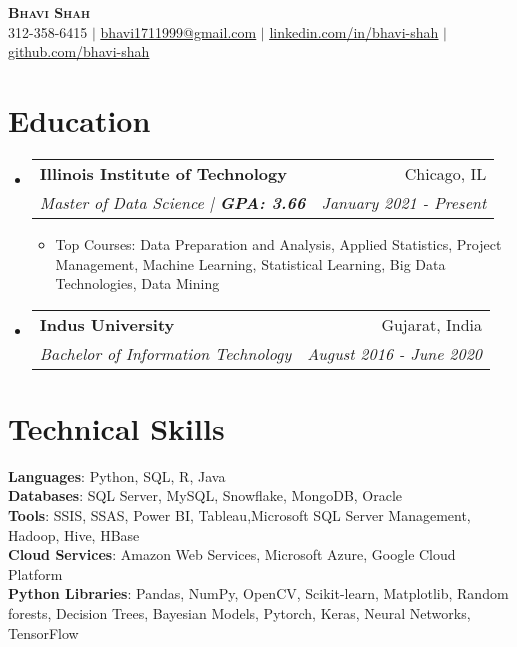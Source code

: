 \documentclass[letterpaper,11pt]{article}
\makeatletter
\newcommand{\resumeItem}[1]{
  \item\small{
    {#1 \vspace{-4.5pt}}
  }
}
\newcommand{\resumeSubheading}[4]{
  \vspace{-2pt}\item
    \begin{tabular*}{0.97\textwidth}[t]{l@{\extracolsep{\fill}}r}
      \textbf{#1} & #2 \\
      \textit{\small#3} & \textit{\small #4} \\
    \end{tabular*}\vspace{-7pt}
}
\newcommand{\resumeSubHeadingListStart}{\begin{itemize}[leftmargin=0.15in, label={}]}
\newcommand{\resumeSubHeadingListEnd}{\end{itemize}}
\newcommand{\resumeItemListStart}{\begin{itemize}}
\newcommand{\resumeItemListEnd}{\end{itemize}\vspace{-5pt}}
\makeatother
\begin{document}


\begin{center}
    \textbf{\Huge \scshape Bhavi Shah} \\ \vspace{1pt}
    \small 312-358-6415 $|$ \href{mailto:bhavi1711999@gmail.com }{\underline{bhavi1711999@gmail.com}} $|$ 
    \href{https://www.linkedin.com/in/bhavi--shah/}{\underline{linkedin.com/in/bhavi-shah}} $|$
    \href{https://github.com/bhavi1719}{\underline{github.com/bhavi-shah}}
\end{center}


\section{Education}
  \resumeSubHeadingListStart
    \resumeSubheading
      {Illinois Institute of Technology }{Chicago, IL}
      {Master of Data Science |\textbf{ GPA: 3.66}}{January 2021 - Present}
          \resumeItemListStart
            \resumeItem{Top Courses: Data Preparation and Analysis, Applied Statistics, Project Management, Machine Learning, Statistical Learning, Big Data Technologies, Data Mining  }
        \resumeItemListEnd
    \resumeSubheading
      {Indus University }{Gujarat, India}
      {Bachelor of Information Technology }{August 2016 - June 2020}

  \resumeSubHeadingListEnd
  
\section{Technical Skills}
 \begin{itemize}[leftmargin=0.15in, label={}]
    \small{\item{
     \textbf{Languages}{: Python, SQL, R, Java} \\
     \textbf{Databases}{: SQL Server, MySQL, Snowflake, MongoDB, Oracle} \\
     \textbf{Tools}{: SSIS, SSAS, Power BI, Tableau,Microsoft SQL Server Management, Hadoop, Hive, HBase } \\
     \textbf{Cloud Services}{: Amazon Web Services, Microsoft Azure, Google Cloud Platform} \\
      \textbf{Python Libraries}{: Pandas, NumPy, OpenCV, Scikit-learn, Matplotlib, Random forests, Decision Trees, Bayesian Models, Pytorch, Keras, Neural Networks, TensorFlow} \\
     
    }}
 \end{itemize}
\end{document}
